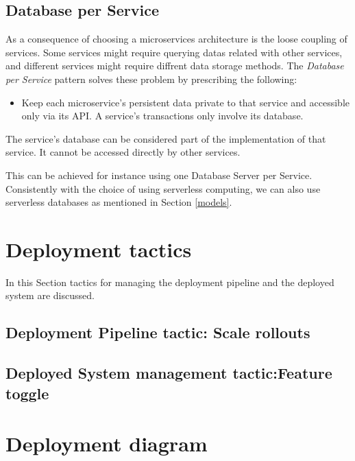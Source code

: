 \documentclass{article}
\begin{document}
\subsection*{Database per Service}
As a consequence of choosing a microservices architecture is the loose coupling of services. Some services might require querying datas related with other services, and different services might require diffrent data storage methods.
The \textit{Database per Service} pattern solves these problem by prescribing the following:
\begin{itemize}
\item Keep each microservice's persistent data private to that service and accessible only via its API. A service's transactions only involve its database.
\end{itemize}

The service's database can be considered part of the implementation of that service. It cannot be accessed directly by other services.

This can be achieved for instance using one Database Server per Service.
Consistently with the choice of using serverless computing, we can also use serverless databases as mentioned in Section \ref{models}.

\section{Deployment tactics}

In this Section tactics for managing the deployment pipeline and the deployed system are discussed.

\subsection*{Deployment Pipeline tactic: Scale rollouts}
\subsection*{Deployed System management tactic:Feature toggle}

\section{Deployment diagram} %
\end{document}
